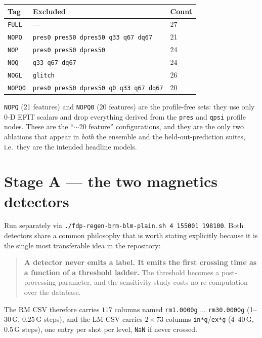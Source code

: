 \documentclass[11pt,a4paper]{article}
\newcommand{\code}[1]{\texttt{\small #1}}
\begin{document}
\begin{center}
\begin{tabular}{@{}lll@{}}
\toprule
Tag & Excluded & Count \\
\midrule
\code{FULL}   & ---                                              & 27 \\
\code{NOPQ}   & \code{pres0 pres50 dpres50 q33 q67 dq67}         & 21 \\
\code{NOP}    & \code{pres0 pres50 dpres50}                      & 24 \\
\code{NOQ}    & \code{q33 q67 dq67}                              & 24 \\
\code{NOGL}   & \code{glitch}                                    & 26 \\
\code{NOPQ0}  & \code{pres0 pres50 dpres50 q0 q33 q67 dq67}      & 20 \\
\bottomrule
\end{tabular}
\end{center}

\code{NOPQ} (21 features) and \code{NOPQ0} (20 features) are the profile-free sets: they use only
0-D EFIT scalars and drop everything derived from the \code{pres} and \code{qpsi} profile nodes.
These are the ``$\sim$20 feature'' configurations, and they are the only two ablations that appear
in \emph{both} the ensemble and the held-out-prediction suites, i.e.\ they are the intended headline
models.

\section{Stage A --- the two magnetics detectors}

Run separately via \code{./fdp-regen-brm-blm-plain.sh 4 155001 198100}. Both detectors share a
common philosophy that is worth stating explicitly because it is the single most transferable idea
in the repository:

\begin{quote}
\textbf{A detector never emits a label. It emits the first crossing time as a function of a
threshold ladder.} The threshold becomes a post-processing parameter, and the sensitivity study
costs no re-computation over the database.
\end{quote}

The RM CSV therefore carries $117$ columns named \code{rm1.0000g} $\dots$ \code{rm30.0000g}
(1--30\,G, $0.25$\,G steps), and the LM CSV carries $2\times73$ columns \code{in*g}/\code{ex*g}
(4--40\,G, $0.5$\,G steps), one entry per shot per level, \code{NaN} if never crossed.
\end{document}
